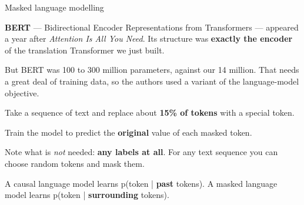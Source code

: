 \documentclass[aspectratio=169,11pt,t]{beamer}
\begin{document}
\begin{frame}[shrink=25]{Masked language modelling}
{\fontsize{9.4}{12.6}\selectfont\color{fg2}\textbf{BERT} --- Bidirectional Encoder Representations from Transformers --- appeared a year after \textit{Attention Is All You Need}. Its structure was \textbf{exactly the encoder} of the translation Transformer we just built.\par}\vskip 4pt
{\fontsize{9.4}{12.6}\selectfont\color{fg2}But BERT was 100 to 300 million parameters, against our 14 million. That needs a great deal of training data, so the authors used a variant of the language-model objective.\par}\vskip 4pt
\begin{isteps}
\item Take a sequence of text and replace about \textbf{15\% of tokens} with a special \inlinecode{[MASK]} token.
\item Train the model to predict the \textbf{original} value of each masked token.
\item Note what is \textit{not} needed: \textbf{any labels at all}. For any text sequence you can choose random tokens and mask them.
\end{isteps}
\begin{iband}[signal]
A causal language model learns p(token | \textbf{past} tokens). A masked language model learns p(token | \textbf{surrounding} tokens).
\end{iband}
\end{frame}
\end{document}

